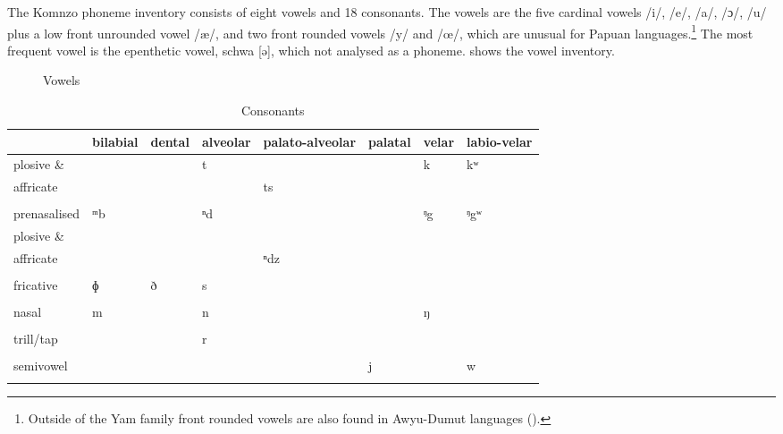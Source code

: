 The Komnzo phoneme inventory consists of eight vowels and 18 consonants. The vowels are the five cardinal vowels /i/, /e/, /a/, /ɔ/, /u/ plus a low front unrounded vowel /æ/, and two front rounded vowels /y/ and /œ/, which are unusual for Papuan languages.\footnote{Outside of the Yam family front rounded vowels are also found in Awyu-Dumut languages (\cite[60]{vanEnk:1997tl}).} The most frequent vowel is the epenthetic vowel, schwa [ə], which not analysed as a phoneme.  shows the vowel inventory.
\vspace{-.3cm}
\begin{figure}
	{
		\begin{vowel}[plain]
		\end{vowel}
	}%
	\caption{Vowels}
	\label{fig-01-vowels}
\end{figure}%
\vspace{-.3cm}
\begin{table}
\caption{Consonants}
\label{tab-01-cons}\small
	\begin{tabularx}{\textwidth}{p{2cm}XXXXXXX}
		\lsptoprule
		& {bilabial}& {dental} & {alveolar} & {palato-alveolar}	& {palatal} & {velar} & {labio-velar} \\ \midrule
		{plosive} \&&&&t&&&k&kʷ\\
		{affricate}&&&&ts&&&\\
		&&&&&&&\\
		{prenasalised} &ᵐb&&ⁿd&&&ᵑg&ᵑgʷ\\
		plosive \& &&&&&&&\\
		affricate&&&&ⁿdz&&&\\
		&&&&&&&\\
		{fricative} & ɸ&ð&s &&&&\\
		&&&&&&&\\
		{nasal} & m && n &&& ŋ & \\
		&&&&&&&\\
		{trill/tap} &&& r &&&&\\
		&&&&&&&\\
		{semivowel} &&&&&j && w\\
		\lspbottomrule
	\end{tabularx}
\end{table}

